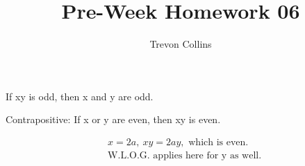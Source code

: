 \documentclass{article}
\title{Pre-Week Homework 06}
\author{Trevon Collins}
\date{}
\begin{document}
\maketitle
If xy is odd, then x and y are odd.

Contrapositive: If x or y are even, then xy is even.

\[
\begin{aligned}
    &x = 2a, \ xy = 2ay, \text{ which is even.}\\
    &\text{W.L.O.G. applies here for y as well.} \\
\end{aligned}
\]
\end{document}
